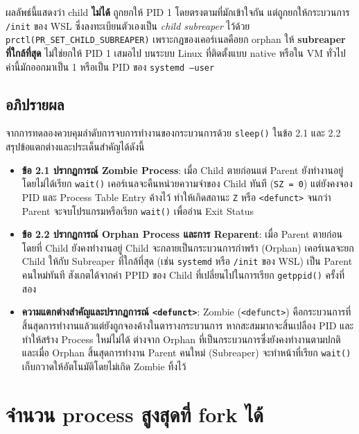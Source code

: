 \documentclass[a4paper,12pt]{article}
\newcommand{\code}[1]{\texttt{#1}}
\begin{document}
ผลลัพธ์นี้แสดงว่า child \textbf{ไม่ได้} ถูกยกให้ PID 1 โดยตรงตามที่มักเข้าใจกัน
แต่ถูกยกให้กระบวนการ \code{/init} ของ WSL ซึ่งลงทะเบียนตัวเองเป็น
\emph{child subreaper} ไว้ด้วย \code{prctl(PR\_SET\_CHILD\_SUBREAPER)}
เพราะกฎของเคอร์เนลคือยก orphan ให้ \textbf{subreaper ที่ใกล้ที่สุด}
ไม่ใช่ยกให้ PID 1 เสมอไป บนระบบ Linux ที่ติดตั้งแบบ native หรือใน VM ทั่วไป
ค่านี้มักออกมาเป็น 1 หรือเป็น PID ของ \code{systemd --user}

\newpage

\subsection{อภิปรายผล}

จากการทดลองควบคุมลำดับการจบการทำงานของกระบวนการด้วย \code{sleep()} ในข้อ 2.1 และ 2.2 สรุปข้อแตกต่างและประเด็นสำคัญได้ดังนี้

\begin{itemize}[leftmargin=*]
  \item \textbf{ข้อ 2.1 ปรากฏการณ์ Zombie Process}:
        เมื่อ Child ตายก่อนแต่ Parent ยังทำงานอยู่โดยไม่ได้เรียก \code{wait()} เคอร์เนลจะคืนหน่วยความจำของ Child ทันที (\code{SZ = 0}) แต่ยังคงจอง PID และ Process Table Entry ค้างไว้ ทำให้เกิดสถานะ \code{Z} หรือ \code{<defunct>} จนกว่า Parent จะจบโปรแกรมหรือเรียก \code{wait()} เพื่ออ่าน Exit Status

  \item \textbf{ข้อ 2.2 ปรากฏการณ์ Orphan Process และการ Reparent}:
        เมื่อ Parent ตายก่อนโดยที่ Child ยังคงทำงานอยู่ Child จะกลายเป็นกระบวนการกำพร้า (Orphan) เคอร์เนลจะยก Child ให้กับ Subreaper ที่ใกล้ที่สุด (เช่น \code{systemd} หรือ \code{/init} ของ WSL) เป็น Parent คนใหม่ทันที สังเกตได้จากค่า PPID ของ Child ที่เปลี่ยนไปในการเรียก \code{getppid()} ครั้งที่สอง

  \item \textbf{ความแตกต่างสำคัญและปรากฏการณ์ \code{<defunct>}}:
        Zombie (\code{<defunct>}) คือกระบวนการที่สิ้นสุดการทำงานแล้วแต่ยังถูกจองค้างในตารางกระบวนการ หากสะสมมากจะสิ้นเปลือง PID และทำให้สร้าง Process ใหม่ไม่ได้ ต่างจาก Orphan ที่เป็นกระบวนการซึ่งยังคงทำงานตามปกติ และเมื่อ Orphan สิ้นสุดการทำงาน Parent คนใหม่ (Subreaper) จะทำหน้าที่เรียก \code{wait()} เก็บกวาดให้อัตโนมัติโดยไม่เกิด Zombie ทิ้งไว้
\end{itemize}
\newpage
\section{จำนวน process สูงสุดที่ fork ได้}
\end{document}
